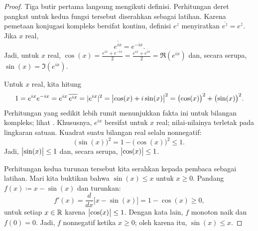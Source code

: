 \begin{proof}
Tiga butir pertama langsung mengikuti definisi.
Perhitungan deret pangkat untuk kedua fungsi tersebut diserahkan sebagai latihan.
Karena pemetaan konjugasi kompleks bersifat kontinu, definisi
$e^z$ menyiratkan
$\overline{e^z} = e^{\bar{z}}$. Jika
$x$ real,
\begin{equation*}
\overline{e^{ix}} = e^{-ix} .
\end{equation*}
Jadi, untuk $x$ real,
$\cos(x) =
\frac{e^{ix}+e^{-ix}}{2} =
\frac{e^{ix}+\overline{e^{ix}}}{2} =
\Re (e^{ix})$
dan, secara serupa, $\sin(x) = \Im (e^{ix})$.

Untuk $x$ real, kita hitung
\begin{equation*}
1 =  e^{ix} e^{-ix}
= e^{ix} \, \overline{e^{ix}}
= \lvert {e^{ix}} \rvert^2
= \bigl\lvert {\cos(x) + i \sin(x)} \bigr\rvert^2
= {\bigl( \cos(x) \bigr)}^2 + {\bigl( \sin(x) \bigr)}^2 .
\end{equation*}
Perhitungan yang sedikit lebih rumit menunjukkan fakta ini untuk
bilangan kompleks; lihat .
Khususnya, $e^{ix}$ bersifat \emph{} untuk $x$ real;
nilai-nilainya terletak pada lingkaran satuan.
Kuadrat suatu bilangan real selalu nonnegatif:
\begin{equation*}
{\bigl(\sin(x)\bigr)}^2 = 1-{\bigl(\cos(x)\bigr)}^2 \leq 1 .
\end{equation*}
Jadi, $\bigl\lvert {\sin(x)} \bigr\rvert \leq 1$ dan, secara serupa,
$\bigl\lvert {\cos(x)} \bigr\rvert \leq 1$.

Perhitungan kedua turunan tersebut kita serahkan kepada pembaca sebagai latihan.
Mari kita buktikan bahwa $\sin(x) \leq x$ untuk $x \geq 0$.
Pandang
$f(x) \coloneqq x-\sin(x)$ dan turunkan:
\begin{equation*}
f'(x) = \frac{d}{dx} \bigl[ x - \sin(x) \bigr]
=
1 -\cos(x) \geq 0 ,
\end{equation*}
untuk setiap $x \in {\mathbb{R}}$ karena $\bigl\lvert {\cos(x)} \bigr\rvert \leq 1$.
Dengan kata lain, $f$ monoton naik dan $f(0) = 0$.
Jadi, $f$ nonnegatif ketika $x \geq 0$; oleh karena itu, $\sin(x) \leq x$.


\end{proof}
